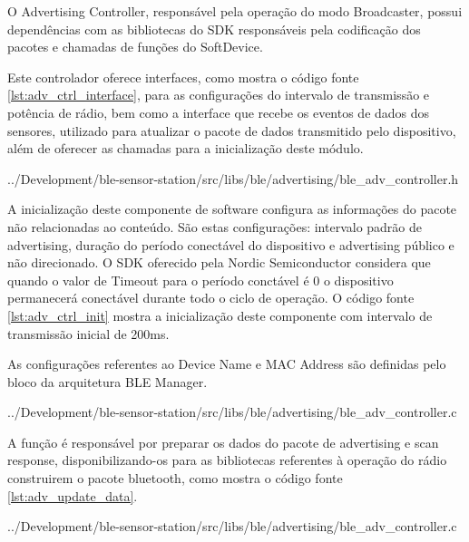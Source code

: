 O Advertising Controller, responsável pela operação do modo Broadcaster, possui
dependências com as bibliotecas do SDK responsáveis pela codificação dos pacotes
e chamadas de funções do SoftDevice.

Este controlador oferece interfaces, como mostra o código fonte
\ref{lst:adv_ctrl_interface}, para as configurações do intervalo de transmissão
e potência de rádio, bem como a interface que recebe os eventos de dados dos
sensores, utilizado para atualizar o pacote de dados transmitido pelo
dispositivo, além de oferecer as chamadas para a inicialização deste módulo.

\begin{minipage}{0.95\linewidth} 
 
{../Development/ble-sensor-station/src/libs/ble/advertising/ble_adv_controller.h}
\end{minipage}

A inicialização deste componente de software configura as informações do pacote
não relacionadas ao conteúdo. São estas configurações: intervalo padrão de
advertising, duração do período conectável do dispositivo e advertising público
e não direcionado. O SDK oferecido pela Nordic Semiconductor considera que
quando o valor de Timeout para o período conctável é 0 o dispositivo permanecerá
conectável durante todo o ciclo de operação\cite{nrf51sdkManual}. O código fonte
\ref{lst:adv_ctrl_init} mostra a inicialização deste componente com intervalo de
transmissão inicial de 200ms.

As configurações referentes ao Device Name e MAC Address são definidas pelo
bloco da arquitetura BLE Manager.

\begin{minipage}{0.95\linewidth} 

{../Development/ble-sensor-station/src/libs/ble/advertising/ble_adv_controller.c}
\end{minipage}

A função  é responsável por preparar os dados do
pacote de advertising e scan response, disponibilizando-os para as bibliotecas
referentes à operação do rádio construirem o pacote bluetooth, como mostra o código fonte
\ref{lst:adv_update_data}.

\begin{minipage}{0.95\linewidth} 
 
{../Development/ble-sensor-station/src/libs/ble/advertising/ble_adv_controller.c}
\end{minipage}


